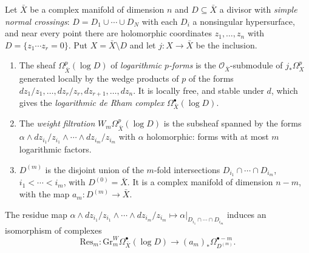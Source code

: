 \begin{definition}\label{mixed-hodge-structures:definition-log-forms}
Let $\bar X$ be a complex manifold of dimension $n$ and $D \subseteq \bar X$ a divisor with \emph{simple normal crossings}: $D = D_1 \cup \cdots \cup D_N$ with each $D_i$ a nonsingular hypersurface, and
near every point there are holomorphic coordinates $z_1, \ldots, z_n$ with $D = \{z_1 \cdots z_r = 0\}$. Put $X = \bar X \setminus D$ and let $j \colon X \to \bar X$ be the inclusion.
\begin{enumerate}
\item The sheaf $\Omega^p_{\bar X}(\log D)$ of \emph{logarithmic $p$-forms} is the $\mathcal{O}_{\bar X}$-submodule of $j_*\Omega^p_X$ generated locally by the wedge products of $p$ of the forms
$dz_1/z_1, \ldots, dz_r/z_r, dz_{r+1}, \ldots, dz_n$. It is locally free, and stable under $d$, which gives the \emph{logarithmic de Rham complex} $\Omega^\bullet_{\bar X}(\log D)$.
\item The \emph{weight filtration} $W_m\Omega^p_{\bar X}(\log D)$ is the subsheaf spanned by the forms $\alpha \wedge dz_{i_1}/z_{i_1} \wedge \cdots \wedge dz_{i_m}/z_{i_m}$ with $\alpha$ holomorphic: forms with at
most $m$ logarithmic factors.
\item $D^{(m)}$ is the disjoint union of the $m$-fold intersections $D_{i_1} \cap \cdots \cap D_{i_m}$, $i_1 < \cdots < i_m$, with $D^{(0)} = \bar X$. It is a complex manifold of dimension $n - m$, with the map
$a_m \colon D^{(m)} \to \bar X$.
\end{enumerate}
\end{definition}

\begin{lemma}\label{mixed-hodge-structures:lemma-residue}
The residue map $\alpha \wedge dz_{i_1}/z_{i_1} \wedge \cdots \wedge dz_{i_m}/z_{i_m} \mapsto \alpha|_{D_{i_1} \cap \cdots \cap D_{i_m}}$ induces an isomorphism of complexes
\[
\mathrm{Res}_m \colon \mathrm{Gr}^W_m\Omega^\bullet_{\bar X}(\log D) \longrightarrow (a_m)_*\Omega^{\bullet-m}_{D^{(m)}}.
\]
\end{lemma}

